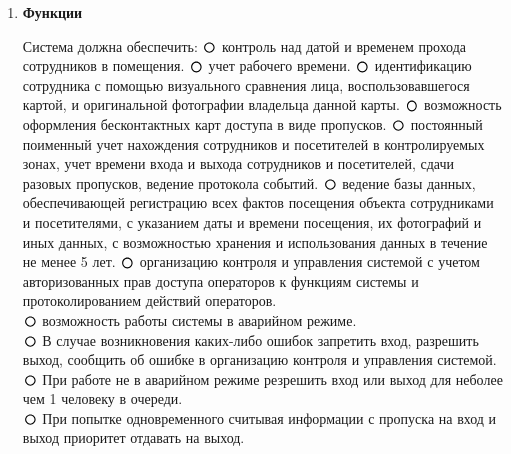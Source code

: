 \documentclass[12pt]{article} %
\def\circmark{\mathbin{\scalerel*{\circ}{j}}}
\begin{document}
\begin{enumerate}
\begin{enumerate}
  			\item \begin{large} \textbf{Функции} \end{large} \newline
  		   Система должна обеспечить:
  		   $\circmark $  контроль над датой и временем прохода сотрудников в помещения. \newline
  		     $\circmark $ учет рабочего времени. \newline
  		      $\circmark $ идентификацию сотрудника с помощью визуального сравнения лица, воспользовавшегося картой, и оригинальной фотографии владельца данной карты.
  		       \newline
  		       $\circmark $ возможность оформления бесконтактных карт доступа в виде пропусков.
  		        \newline
  		        $\circmark $ постоянный поименный учет нахождения сотрудников и посетителей в контролируемых зонах, учет времени входа и выхода сотрудников и посетителей, сдачи разовых пропусков, ведение протокола событий.
  		         \newline
  		         $\circmark $ ведение базы данных, обеспечивающей регистрацию всех фактов посещения объекта сотрудниками и посетителями, с указанием даты и времени посещения, их фотографий и иных данных, с возможностью хранения и использования данных в течение не менее 5 лет.
  		          \newline
  		          $\circmark $ организацию контроля и управления системой с учетом авторизованных прав доступа операторов к функциям системы и протоколированием действий операторов. \newline\\
  		           $\circmark $ возможность работы системы в аварийном режиме. \newline\\
  		           $\circmark $ В случае возникновения каких-либо ошибок запретить вход, разрешить выход, сообщить об ошибке в организацию контроля и управления системой.   \newline\\
  		            $\circmark $ При работе не в аварийном режиме резрешить вход или выход для неболее чем 1 человеку в очереди.    \newline\\
  		            $\circmark $ При попытке одновременного считывая информации с пропуска на вход и выход приоритет отдавать на выход.    \newline\\
  		          		   

\end{enumerate}
\end{enumerate}
\end{document}
